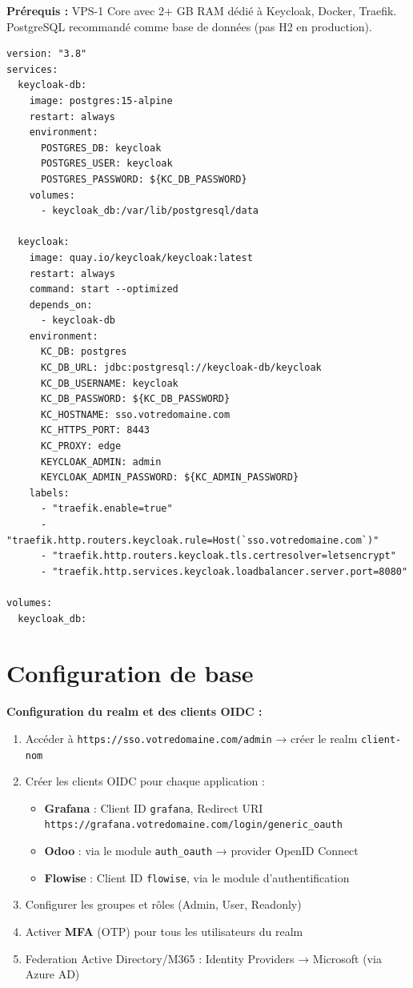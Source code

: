 \documentclass[11pt, a4paper]{article}
\begin{document}
\textbf{Prérequis :} VPS-1 Core avec 2+ GB RAM dédié à Keycloak, Docker, Traefik. PostgreSQL recommandé comme base de données (pas H2 en production).

\begin{lstlisting}[style=yamlstyle, caption={docker-compose.yml — Keycloak + PostgreSQL}]
version: "3.8"
services:
  keycloak-db:
    image: postgres:15-alpine
    restart: always
    environment:
      POSTGRES_DB: keycloak
      POSTGRES_USER: keycloak
      POSTGRES_PASSWORD: ${KC_DB_PASSWORD}
    volumes:
      - keycloak_db:/var/lib/postgresql/data

  keycloak:
    image: quay.io/keycloak/keycloak:latest
    restart: always
    command: start --optimized
    depends_on:
      - keycloak-db
    environment:
      KC_DB: postgres
      KC_DB_URL: jdbc:postgresql://keycloak-db/keycloak
      KC_DB_USERNAME: keycloak
      KC_DB_PASSWORD: ${KC_DB_PASSWORD}
      KC_HOSTNAME: sso.votredomaine.com
      KC_HTTPS_PORT: 8443
      KC_PROXY: edge
      KEYCLOAK_ADMIN: admin
      KEYCLOAK_ADMIN_PASSWORD: ${KC_ADMIN_PASSWORD}
    labels:
      - "traefik.enable=true"
      - "traefik.http.routers.keycloak.rule=Host(`sso.votredomaine.com`)"
      - "traefik.http.routers.keycloak.tls.certresolver=letsencrypt"
      - "traefik.http.services.keycloak.loadbalancer.server.port=8080"

volumes:
  keycloak_db:
\end{lstlisting}

\section{Configuration de base}

\textbf{Configuration du realm et des clients OIDC :}
\begin{enumerate}
  \item Accéder à \texttt{https://sso.votredomaine.com/admin} → créer le realm \texttt{client-nom}
  \item Créer les clients OIDC pour chaque application :
    \begin{itemize}
      \item \textbf{Grafana} : Client ID \texttt{grafana}, Redirect URI \texttt{https://grafana.votredomaine.com/login/generic\_oauth}
      \item \textbf{Odoo} : via le module \texttt{auth\_oauth} → provider OpenID Connect
      \item \textbf{Flowise} : Client ID \texttt{flowise}, via le module d'authentification
    \end{itemize}
  \item Configurer les groupes et rôles (Admin, User, Readonly)
  \item Activer \textbf{MFA} (OTP) pour tous les utilisateurs du realm
  \item Federation Active Directory/M365 : Identity Providers → Microsoft (via Azure AD)
\end{enumerate}
\end{document}
